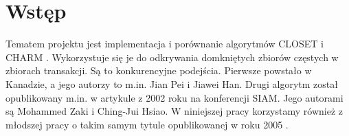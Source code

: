 \section{Wstęp}

Tematem projektu jest implementacja i porównanie algorytmów CLOSET \cite{closetArt} i CHARM \cite{charmArt}. Wykorzystuje się je do odkrywania domkniętych zbiorów częstych w zbiorach transakcji.
Są to konkurencyjne podejścia. Pierwsze powstało w Kanadzie, a jego autorzy to m.in. Jian Pei i Jiawei Han. Drugi algorytm został opublikowany m.in. w artykule z 2002 roku na konferencji SIAM. Jego autorami są Mohammed Zaki i Ching-Jui Hsiao. W niniejszej pracy korzystamy również z młodszej pracy o takim samym tytule opublikowanej w roku 2005 \cite{charmArt}.

